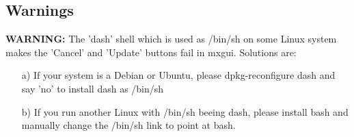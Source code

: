 \subsection{Warnings}
{\bfseries WARNING:} The 'dash' shell which is used as /bin/sh on some Linux system makes the 'Cancel' and 'Update' 
buttons fail in mxgui. Solutions are:
\begin{itemize}
  \item[a)] If your system is a Debian or Ubuntu, please dpkg-reconfigure dash and say 'no' to install dash as /bin/sh
  \item[b)] If you run another Linux with /bin/sh beeing dash, please install bash and manually change the /bin/sh link to point at bash.
\end{itemize}

